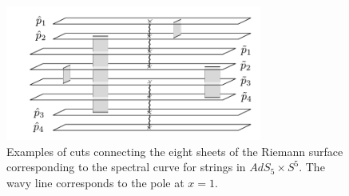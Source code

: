\begin{figure}[t]
	\centering
		\includegraphics[width=0.75\textwidth]{../graphics/cuts}
	\caption{Examples of cuts connecting the eight sheets of the Riemann surface corresponding to the spectral curve for strings in $AdS_5 \times S^5$. The wavy line corresponds to the pole at $x = 1$.}
	\label{fig:cuts}
\end{figure}

